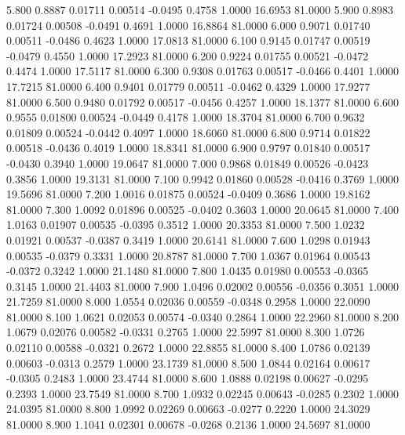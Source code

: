    5.800   0.8887   0.01711   0.00514  -0.0495   0.4758   1.0000  16.6953  81.0000
   5.900   0.8983   0.01724   0.00508  -0.0491   0.4691   1.0000  16.8864  81.0000
   6.000   0.9071   0.01740   0.00511  -0.0486   0.4623   1.0000  17.0813  81.0000
   6.100   0.9145   0.01747   0.00519  -0.0479   0.4550   1.0000  17.2923  81.0000
   6.200   0.9224   0.01755   0.00521  -0.0472   0.4474   1.0000  17.5117  81.0000
   6.300   0.9308   0.01763   0.00517  -0.0466   0.4401   1.0000  17.7215  81.0000
   6.400   0.9401   0.01779   0.00511  -0.0462   0.4329   1.0000  17.9277  81.0000
   6.500   0.9480   0.01792   0.00517  -0.0456   0.4257   1.0000  18.1377  81.0000
   6.600   0.9555   0.01800   0.00524  -0.0449   0.4178   1.0000  18.3704  81.0000
   6.700   0.9632   0.01809   0.00524  -0.0442   0.4097   1.0000  18.6060  81.0000
   6.800   0.9714   0.01822   0.00518  -0.0436   0.4019   1.0000  18.8341  81.0000
   6.900   0.9797   0.01840   0.00517  -0.0430   0.3940   1.0000  19.0647  81.0000
   7.000   0.9868   0.01849   0.00526  -0.0423   0.3856   1.0000  19.3131  81.0000
   7.100   0.9942   0.01860   0.00528  -0.0416   0.3769   1.0000  19.5696  81.0000
   7.200   1.0016   0.01875   0.00524  -0.0409   0.3686   1.0000  19.8162  81.0000
   7.300   1.0092   0.01896   0.00525  -0.0402   0.3603   1.0000  20.0645  81.0000
   7.400   1.0163   0.01907   0.00535  -0.0395   0.3512   1.0000  20.3353  81.0000
   7.500   1.0232   0.01921   0.00537  -0.0387   0.3419   1.0000  20.6141  81.0000
   7.600   1.0298   0.01943   0.00535  -0.0379   0.3331   1.0000  20.8787  81.0000
   7.700   1.0367   0.01964   0.00543  -0.0372   0.3242   1.0000  21.1480  81.0000
   7.800   1.0435   0.01980   0.00553  -0.0365   0.3145   1.0000  21.4403  81.0000
   7.900   1.0496   0.02002   0.00556  -0.0356   0.3051   1.0000  21.7259  81.0000
   8.000   1.0554   0.02036   0.00559  -0.0348   0.2958   1.0000  22.0090  81.0000
   8.100   1.0621   0.02053   0.00574  -0.0340   0.2864   1.0000  22.2960  81.0000
   8.200   1.0679   0.02076   0.00582  -0.0331   0.2765   1.0000  22.5997  81.0000
   8.300   1.0726   0.02110   0.00588  -0.0321   0.2672   1.0000  22.8855  81.0000
   8.400   1.0786   0.02139   0.00603  -0.0313   0.2579   1.0000  23.1739  81.0000
   8.500   1.0844   0.02164   0.00617  -0.0305   0.2483   1.0000  23.4744  81.0000
   8.600   1.0888   0.02198   0.00627  -0.0295   0.2393   1.0000  23.7549  81.0000
   8.700   1.0932   0.02245   0.00643  -0.0285   0.2302   1.0000  24.0395  81.0000
   8.800   1.0992   0.02269   0.00663  -0.0277   0.2220   1.0000  24.3029  81.0000
   8.900   1.1041   0.02301   0.00678  -0.0268   0.2136   1.0000  24.5697  81.0000
